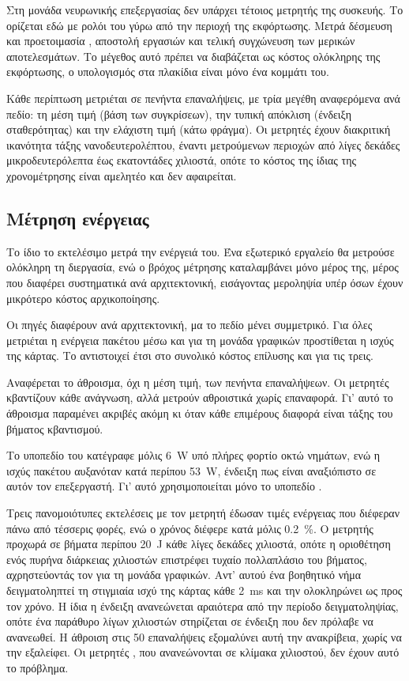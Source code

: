 Στη μονάδα νευρωνικής επεξεργασίας δεν υπάρχει τέτοιος μετρητής της συσκευής.
Το  ορίζεται εδώ με ρολόι του  γύρω από την περιοχή της
εκφόρτωσης. Μετρά δέσμευση και προετοιμασία , αποστολή εργασιών και
τελική συγχώνευση των μερικών αποτελεσμάτων. Το μέγεθος αυτό πρέπει να
διαβάζεται ως κόστος ολόκληρης της εκφόρτωσης, ο υπολογισμός στα πλακίδια
 είναι μόνο ένα κομμάτι του.

Κάθε περίπτωση μετριέται σε πενήντα επαναλήψεις, με τρία μεγέθη αναφερόμενα ανά
πεδίο: τη μέση τιμή (βάση των συγκρίσεων), την τυπική απόκλιση (ένδειξη
σταθερότητας) και την ελάχιστη τιμή (κάτω φράγμα). Οι μετρητές έχουν διακριτική
ικανότητα τάξης νανοδευτερολέπτου, έναντι μετρούμενων περιοχών από λίγες
δεκάδες μικροδευτερόλεπτα έως εκατοντάδες χιλιοστά, οπότε το κόστος της ίδιας
της χρονομέτρησης είναι αμελητέο και δεν αφαιρείται.

\subsection{Μέτρηση ενέργειας}
\label{sec:meth-energy}

Το ίδιο το εκτελέσιμο μετρά την ενέργειά του. Ένα εξωτερικό εργαλείο θα
μετρούσε ολόκληρη τη διεργασία, ενώ ο βρόχος μέτρησης καταλαμβάνει μόνο μέρος
της, μέρος που διαφέρει συστηματικά ανά αρχιτεκτονική, εισάγοντας μεροληψία
υπέρ όσων έχουν μικρότερο κόστος αρχικοποίησης.

Οι πηγές διαφέρουν ανά αρχιτεκτονική, μα το πεδίο μένει συμμετρικό. Για όλες
μετριέται η ενέργεια πακέτου μέσω  και για τη μονάδα γραφικών
προστίθεται η ισχύς της κάρτας. Το  αντιστοιχεί έτσι στο
συνολικό κόστος επίλυσης και για τις τρεις.

Αναφέρεται το άθροισμα, όχι η μέση τιμή, των πενήντα επαναλήψεων. Οι μετρητές
 κβαντίζουν κάθε ανάγνωση, αλλά μετρούν αθροιστικά χωρίς επαναφορά.
Γι' αυτό το άθροισμα παραμένει ακριβές ακόμη κι όταν κάθε επιμέρους διαφορά
είναι τάξης του βήματος κβαντισμού.

Το υποπεδίο  του  κατέγραφε μόλις \qty{6}{\watt} υπό πλήρες
φορτίο οκτώ νημάτων, ενώ η ισχύς πακέτου αυξανόταν κατά περίπου
\qty{53}{\watt}, ένδειξη πως είναι αναξιόπιστο σε αυτόν τον επεξεργαστή. Γι'
αυτό χρησιμοποιείται μόνο το υποπεδίο .

Τρεις πανομοιότυπες εκτελέσεις με τον μετρητή  έδωσαν τιμές ενέργειας
που διέφεραν πάνω από τέσσερις φορές, ενώ ο χρόνος διέφερε κατά μόλις
\qty{0.2}{\percent}. Ο μετρητής προχωρά σε βήματα περίπου \qty{20}{\joule} κάθε
λίγες δεκάδες χιλιοστά, οπότε η οριοθέτηση ενός πυρήνα διάρκειας χιλιοστών
επιστρέφει τυχαίο πολλαπλάσιο του βήματος, αχρηστεύοντάς τον για τη μονάδα
γραφικών. Αντ' αυτού ένα βοηθητικό νήμα δειγματοληπτεί τη στιγμιαία ισχύ της
κάρτας κάθε \qty{2}{\milli\second} και την ολοκληρώνει ως προς τον χρόνο. Η
ίδια η ένδειξη ανανεώνεται αραιότερα από την περίοδο δειγματοληψίας, οπότε ένα
παράθυρο  λίγων χιλιοστών στηρίζεται σε ένδειξη που δεν πρόλαβε να
ανανεωθεί. Η άθροιση στις 50 επαναλήψεις εξομαλύνει αυτή την ανακρίβεια, χωρίς
να την εξαλείφει. Οι μετρητές , που ανανεώνονται σε κλίμακα χιλιοστού,
δεν έχουν αυτό το πρόβλημα.

